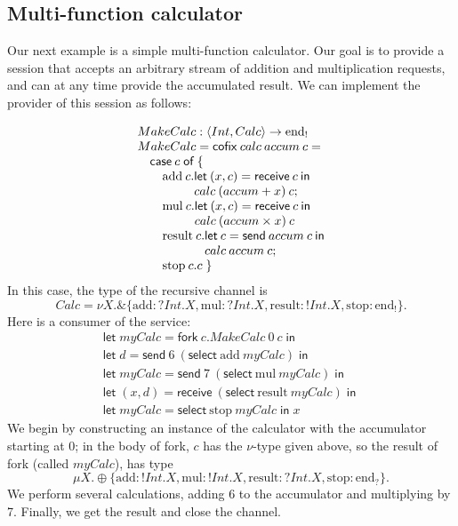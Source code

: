 \documentclass[orivec,envcountsame]{llncs}
\makeatletter
\newcommand{\with}{\mathbin\binampersand}
\newcommand{\gvout}[2]{{!#1.#2}}
\newcommand{\gvin}[2]{{?#1.#2}}
\newcommand{\uto}{\ensuremath{\rightarrow}}
\newcommand{\outterm}{\mathrm{end}_!}
\newcommand{\interm}{\mathrm{end}_?}
\newcommand{\mkwd}[1]{\mathsf{#1}}
\newcommand{\tkwd}[1]{\textsf{#1}}
\newcommand{\clabel}[1]{\mathrm{#1}}
\newcommand{\gvsend}[2]{\mkwd{send}\:#1\:#2}
\newcommand{\gvreceive}[1]{\mkwd{receive}\:#1}
\newcommand{\gvlet}[3]{\mkwd{let}\;#1 = #2\;\mkwd{in}\;#3}
\newcommand{\gvselect}[2]{\mkwd{select}\:#1\:#2}
\newcommand{\gvfork}[2]{\mkwd{fork}\:#1.#2}
\newcommand{\lrkwd}{\mkwd{cofix}}
\newcommand{\ba}{\begin{array}}
\newcommand{\ea}{\end{array}}
\newcommand{\bl}{\ba[t]{@{}l@{}}}
\newcommand{\el}{\ea}
\makeatother
\begin{document}
\subsection{Multi-function calculator}

Our next example is a simple multi-function calculator. Our goal is to provide a session that
accepts an arbitrary stream of addition and multiplication requests, and can at any time provide the
accumulated result.  We can implement the provider of this session as follows:

\[
\bl
MakeCalc : \langle Int, Calc \rangle \uto \outterm \\
MakeCalc = \lrkwd\:calc\:accum\:c = \\
\quad
  \bl
  \mkwd{case}\:c\;\mkwd{of}\:\{ \\
  \quad
    \bl
    \clabel{add}\:c. 
      \bl
      \mkwd{let}\:(x,c) = \gvreceive{c} \: \mkwd{in} \\
      calc\:(accum + x)\:c; \\
      \el \\
    \clabel{mul}\:c.
      \bl
      \mkwd{let}\:(x,c) = \gvreceive{c}\:\mkwd{in} \\
      calc\:(accum \times x)\:c \\
      \el \\
    \clabel{result}\:c. 
      \bl
      \mkwd{let}\:c = \gvsend{accum}{c}\:\mkwd{in} \\
      calc\:accum\:c; \\
      \el \\
    \clabel{stop}\:c.c \; \}
    \el \\
  \el \\
\el
\]
In this case, the type of the recursive channel is
\[
 Calc = \nu X. \with \{ \clabel{add}: \gvin{Int}{X},
                        \clabel{mul}: \gvin{Int}{X},
                        \clabel{result}: \gvout{Int}{X},
                        \clabel{stop}: \outterm \}.
\]%
Here is a consumer of the service:
\[\begin{array}{l}
  \gvlet{myCalc}{\gvfork{c}{MakeCalc\:0\:c}}{} \\
  \gvlet{d}{\gvsend{6}{(\gvselect{\clabel{add}}{myCalc})}}{} \\
  \gvlet{myCalc}{\gvsend{7}{(\gvselect{\clabel{mul}}{myCalc})}}{} \\
  \gvlet{(x,d)}{\gvreceive{(\gvselect{\clabel{result}}{myCalc})}}{} \\
  \gvlet{myCalc}{\gvselect{\clabel{stop}}{myCalc}}{x}
\end{array}\]
We begin by constructing an instance of the calculator with the accumulator starting at 0; in the
body of \tkwd{fork}, $c$ has the $\nu$-type given above, so the result of \tkwd{fork} (called
$myCalc$), has type
\[
\mu X. \oplus \{ \clabel{add}: \gvout{Int}{X}, \clabel{mul}: \gvout{Int}{X}, \clabel{result}: \gvin{Int}{X}, \clabel{stop}: \interm \}.
\]
We perform several calculations, adding 6 to the accumulator and multiplying by 7.  Finally, we get
the result and close the channel.
\end{document}
